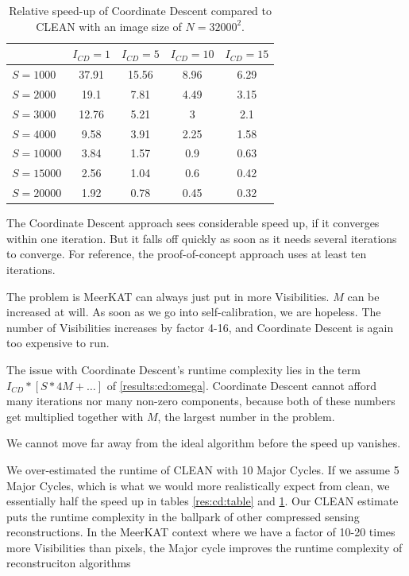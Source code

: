 \begin{table}[h!]
	\begin{center}
		\begin{tabular}{l|c|c|c|c} %
			& $I_{CD} = 1$ & $I_{CD} = 5$ &  $I_{CD} = 10$ &  $I_{CD} = 15$\\
			\hline
			$S=1000$ & 37.91 & 15.56 & 8.96 & 6.29 \\
			$S=2000$ & 19.1 & 7.81 & 4.49 & 3.15  \\
			$S=3000$ & 12.76 & 5.21 & 3 & 2.1  \\
			$S=4000$ & 9.58 & 3.91 & 2.25 & 1.58 \\
			\hline
			$S=10000$ & 3.84 & 1.57 & 0.9 & 0.63  \\
			$S=15000$ & 2.56 & 1.04 & 0.6 & 0.42\\
			$S=20000$ & 1.92 & 0.78 & 0.45 & 0.32 \\
		\end{tabular}
		\caption{Relative speed-up of Coordinate Descent compared to CLEAN with an image size of $N=32000^2$. }
		\label{res:cd:large:table}
	\end{center}
\end{table}

The Coordinate Descent approach sees considerable speed up, if it converges within one iteration. But it falls off quickly as soon as it needs several iterations to converge. For reference, the proof-of-concept approach uses at least ten iterations. 

The problem is MeerKAT can always just put in more Visibilities. $M$ can be increased at will. As soon as we go into self-calibration, we are hopeless. The number of Visibilities increases by factor 4-16, and Coordinate Descent is again too expensive to run.

The issue with Coordinate Descent's runtime complexity lies in the term $I_{CD} * [S * 4M +\ldots]$ of \eqref{results:cd:omega}. Coordinate Descent cannot afford many iterations nor many non-zero components, because both of these numbers get multiplied together with $M$, the largest number in the problem.

We cannot move far away from the ideal algorithm before the speed up vanishes. 

We over-estimated the runtime of CLEAN with 10 Major Cycles. If we assume 5 Major Cycles, which is what we would more realistically expect from clean, we essentially half the speed up in tables \ref{res:cd:table} and \ref{res:cd:large:table}. Our CLEAN estimate puts the runtime complexity in the ballpark of other compressed sensing reconstructions.
In the MeerKAT context where we have a factor of 10-20 times more Visibilities than pixels, the Major cycle improves the runtime complexity of reconstruciton algorithms


